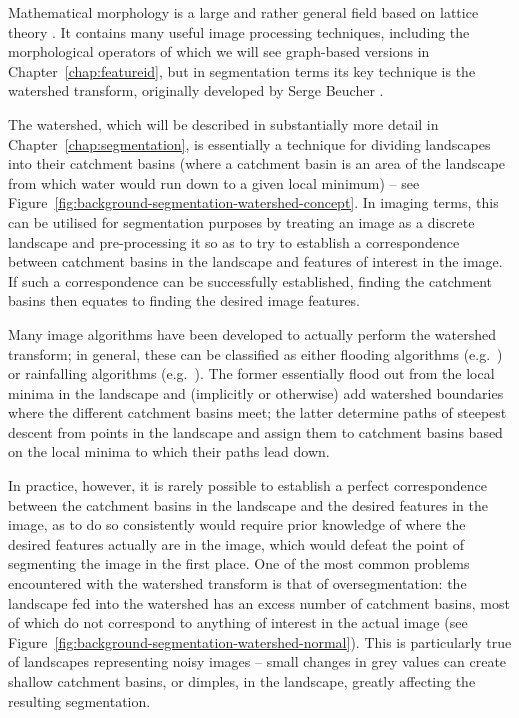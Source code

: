 
Mathematical morphology is a large and rather general field based on lattice theory \cite{goutsias00}. It contains many useful image processing techniques, including the morphological operators of which we will see graph-based versions in Chapter~\ref{chap:featureid}, but in segmentation terms its key technique is the watershed transform, originally developed by Serge Beucher \cite{beucher90}.

The watershed, which will be described in substantially more detail in Chapter~\ref{chap:segmentation}, is essentially a technique for dividing landscapes into their catchment basins (where a catchment basin is an area of the landscape from which water would run down to a given local minimum) -- see Figure~\ref{fig:background-segmentation-watershed-concept}. In imaging terms, this can be utilised for segmentation purposes by treating an image as a discrete landscape and pre-processing it so as to try to establish a correspondence between catchment basins in the landscape and features of interest in the image. If such a correspondence can be successfully established, finding the catchment basins then equates to finding the desired image features.


Many image algorithms have been developed to actually perform the watershed transform; in general, these can be classified as either flooding algorithms (e.g.~\cite{bieniek00,rambabu07}) or rainfalling algorithms (e.g.~\cite{meijster98,osma-ruiz06,stoev00}). The former essentially flood out from the local minima in the landscape and (implicitly or otherwise) add watershed boundaries where the different catchment basins meet; the latter determine paths of steepest descent from points in the landscape and assign them to catchment basins based on the local minima to which their paths lead down.

In practice, however, it is rarely possible to establish a perfect correspondence between the catchment basins in the landscape and the desired features in the image, as to do so consistently would require prior knowledge of where the desired features actually are in the image, which would defeat the point of segmenting the image in the first place. One of the most common problems encountered with the watershed transform is that of oversegmentation: the landscape fed into the watershed has an excess number of catchment basins, most of which do not correspond to anything of interest in the actual image (see Figure~\ref{fig:background-segmentation-watershed-normal}). This is particularly true of landscapes representing noisy images -- small changes in grey values can create shallow catchment basins, or dimples, in the landscape, greatly affecting the resulting segmentation.

